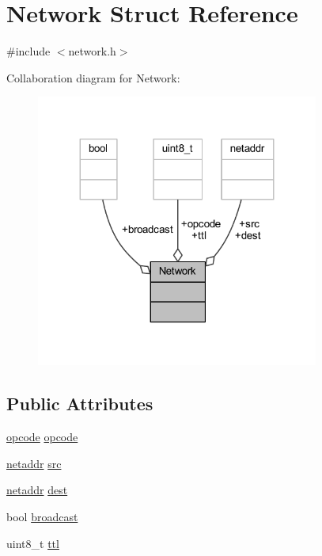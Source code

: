 \hypertarget{struct_network}{}\section{Network Struct Reference}
\label{struct_network}


{\ttfamily \#include $<$network.\+h$>$}



Collaboration diagram for Network\+:
\nopagebreak
\begin{figure}[H]
\begin{center}
\leavevmode
\includegraphics[width=263pt]{struct_network__coll__graph}
\end{center}
\end{figure}
\subsection*{Public Attributes}
\begin{DoxyCompactItemize}
\item 
\hyperlink{packet_8h_a5ce68aceddf17a30aa045fc04914e798}{opcode} \hyperlink{struct_network_a7dbabb0a4769aa2988ea4c164ce337a3}{opcode}
\item 
\hyperlink{network_8h_a1924fa1e3480e5fb3c72b8ef3e243f57}{netaddr} \hyperlink{struct_network_aea4b9cff07746e6716d666b8f30206c3}{src}
\item 
\hyperlink{network_8h_a1924fa1e3480e5fb3c72b8ef3e243f57}{netaddr} \hyperlink{struct_network_afdd665550f4249de0fe44a6873c106d5}{dest}
\item 
bool \hyperlink{struct_network_a32536a76f2f24b4698231a165fdd26a8}{broadcast}
\item 
uint8\+\_\+t \hyperlink{struct_network_ae8a4e88963892ccee2ef2c239bb3db96}{ttl}
\end{DoxyCompactItemize}



